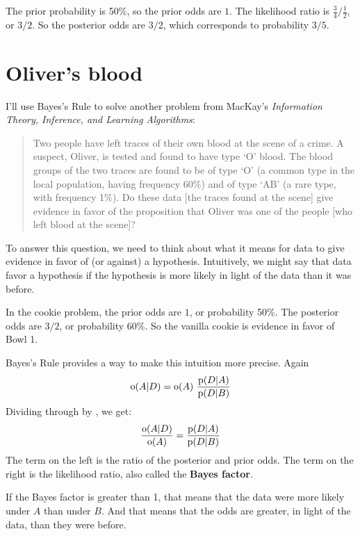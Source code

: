 \documentclass[12pt]{book}
\theoremstyle{exercise}
\begin{document}
The prior probability is 50\%, so the prior odds are $1$.
The likelihood ratio is $\frac{3}{4} / \frac{1}{2}$, or $3/2$.
So the posterior odds are $3/2$, which corresponds to probability
$3/5$.


\section{Oliver's blood}
\label{oliver}


I'll use Bayes's Rule to solve another problem from MacKay's {\it Information Theory, Inference, and Learning Algorithms}:

\begin{quote}
Two people have left traces of their own blood at the scene of
a crime.  A suspect, Oliver, is tested and found to have type
`O' blood.  The blood groups of the two traces are found to
be of type `O' (a common type in the local population, having frequency
60\%) and of type `AB' (a rare type, with frequency 1\%).
Do these data [the traces found at the scene] give evidence
in favor of the proposition that Oliver was one of the people
[who left blood at the scene]?
\end{quote}

To answer this question, we need to think about what it means
for data to give evidence in favor of (or against) a hypothesis.
Intuitively, we might say that data favor a hypothesis if the
hypothesis is more likely in light of the data than it was before.


In the cookie problem, the prior odds are $1$, or probability 50\%.
The posterior odds are $3/2$, or probability 60\%.  
So the vanilla cookie is evidence in favor of Bowl 1.

Bayes's Rule provides a way to make this intuition more precise.  Again
%
\[ \mathrm{o}(A|D) = \mathrm{o}(A)~\frac{\mathrm{p}(D|A)}{\mathrm{p}(D|B)} \]
%
Dividing through by , we get:
%
\[ \frac{\mathrm{o}(A|D)}{\mathrm{o}(A)} = \frac{\mathrm{p}(D|A)}{\mathrm{p}(D|B)} \]
%
The term on the left is the ratio of the posterior and prior odds.
The term on the right is the likelihood ratio, also called the {\bf Bayes
factor}.


If the Bayes factor is greater than 1, that means that the
data were more likely under $A$ than under $B$.  
And that means that the odds are greater, in light of the data, than they were before.
\end{document}
